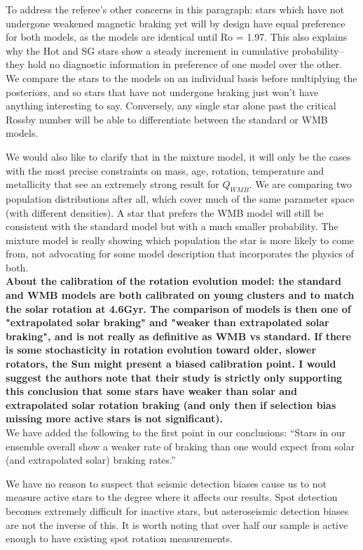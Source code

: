 \documentclass[11pt]{article}
\begin{document}
To address the referee’s other concerns in this paragraph: stars which have not undergone weakened magnetic braking yet will by design have equal preference for both models, as the models are identical until Ro = 1.97. This also explains why the Hot and SG stars show a steady increment in cumulative probability-- they hold no diagnostic information in preference of one model over the other. We compare the stars to the models on an individual basis before multiplying the posteriors, and so stars that have not undergone braking just won’t have anything interesting to say. Conversely, any single star alone past the critical Rossby number will be able to differentiate between the standard or WMB models.

We would also like to clarify that in the mixture model, it will only be the cases with the most precise constraints on mass, age, rotation, temperature and metallicity that see an extremely strong result for $Q_{WMB}$. We are comparing two population distributions after all, which cover much of the same parameter space (with different densities). A star that prefers the WMB model will still be consistent with the standard model but with a much smaller probability. The mixture model is really showing which population the star is more likely to come from, not advocating for some model description that incorporates the physics of both.\\

\noindent\textbf{About the calibration of the rotation evolution model: the standard and WMB models are both calibrated on young clusters and to match the solar rotation at 4.6Gyr. The comparison of models is then one of "extrapolated solar braking" and "weaker than extrapolated solar braking", and is not really as definitive as WMB vs standard. If there is some stochasticity in rotation evolution toward older, slower rotators, the Sun might present a biased calibration point. I would suggest the authors note that their study is strictly only supporting this conclusion that some stars have weaker than solar and extrapolated solar rotation braking (and only then if selection bias missing more active stars is not significant).}\\

We have added the following to the first point in our conclusions: “Stars in our ensemble overall show a weaker rate of braking than one would expect from solar (and extrapolated solar) braking rates.”

We have no reason to suspect that seismic detection biases cause us to not measure active stars to the degree where it affects our results. Spot detection becomes extremely difficult for inactive stars, but asteroseismic detection biases are not the inverse of this. It is worth noting that over half our sample is active enough to have existing spot rotation measurements.
\end{document}
